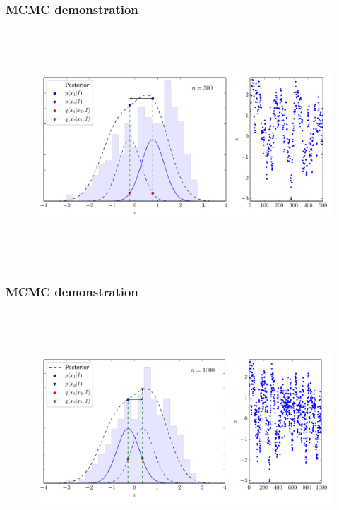 \begin{frame}

\frametitle{MCMC demonstration}
\label{mcmcdemonstration}

\begin{figure}[htbp]
\centering
\includegraphics[keepaspectratio,width=\textwidth,height=250pt]{figures/mcmc_example_5.pdf}
\label{mcmc_example_5}
\end{figure}

\end{frame}

\begin{frame}

\frametitle{MCMC demonstration}
\label{mcmcdemonstration}

\begin{figure}[htbp]
\centering
\includegraphics[keepaspectratio,width=\textwidth,height=250pt]{figures/mcmc_example_6.pdf}
\label{mcmc_example_6}
\end{figure}

\end{frame}

